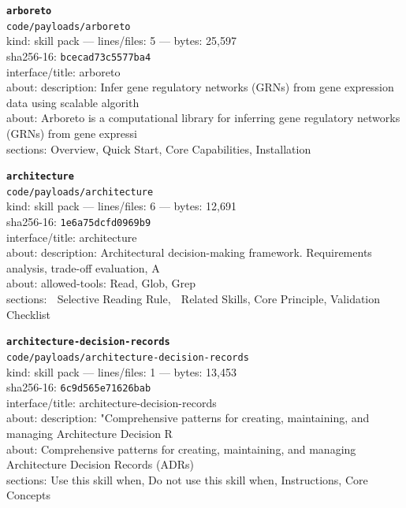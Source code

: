 \noindent\textbf{\texttt{arboreto}}\\
\texttt{code/payloads/arboreto}\\
kind: skill pack --- lines/files: 5 --- bytes: 25,597\\
sha256-16: \texttt{bcecad73c5577ba4}\\
interface/title: arboreto\\
about: description: Infer gene regulatory networks (GRNs) from gene expression data using scalable algorith\\
about: Arboreto is a computational library for inferring gene regulatory networks (GRNs) from gene expressi\\
sections: Overview, Quick Start, Core Capabilities, Installation\\
\vspace*{6.0pt}

\noindent\textbf{\texttt{architecture}}\\
\texttt{code/payloads/architecture}\\
kind: skill pack --- lines/files: 6 --- bytes: 12,691\\
sha256-16: \texttt{1e6a75dcfd0969b9}\\
interface/title: architecture\\
about: description: Architectural decision-making framework. Requirements analysis, trade-off evaluation, A\\
about: allowed-tools: Read, Glob, Grep\\
sections: 🎯 Selective Reading Rule, 🔗 Related Skills, Core Principle, Validation Checklist\\
\vspace*{6.0pt}
\newpage

\noindent\textbf{\texttt{architecture-decision-records}}\\
\texttt{code/payloads/architecture-decision-records}\\
kind: skill pack --- lines/files: 1 --- bytes: 13,453\\
sha256-16: \texttt{6c9d565e71626bab}\\
interface/title: architecture-decision-records\\
about: description: "Comprehensive patterns for creating, maintaining, and managing Architecture Decision R\\
about: Comprehensive patterns for creating, maintaining, and managing Architecture Decision Records (ADRs) \\
sections: Use this skill when, Do not use this skill when, Instructions, Core Concepts\\
\vspace*{6.0pt}

